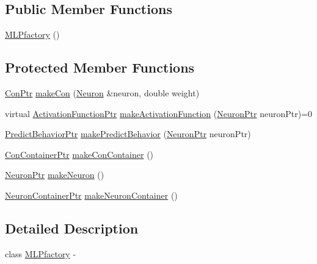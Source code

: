 \subsection*{Public Member Functions}
\begin{DoxyCompactItemize}
\item 
\hyperlink{class_m_l_pfactory_a61dfce37d0344c58e275e8508b0a474c}{MLPfactory} ()
\end{DoxyCompactItemize}
\subsection*{Protected Member Functions}
\begin{DoxyCompactItemize}
\item 
\hyperlink{_a_m_o_r_e_8h_a169bb8e5f26ce70bf2b10dec2fb5ee50}{ConPtr} \hyperlink{class_m_l_pfactory_ac47beb4aced10b9c99414ba7dd7c8b55}{makeCon} (\hyperlink{class_neuron}{Neuron} \&neuron, double weight)
\item 
virtual \hyperlink{_a_m_o_r_e_8h_a77602a0277a02e5769c3df0adc669b17}{ActivationFunctionPtr} \hyperlink{class_m_l_pfactory_a92109ea285be7dd847d359a1ade9064a}{makeActivationFunction} (\hyperlink{_a_m_o_r_e_8h_ac1ea936c2c7728eb382278131652fef4}{NeuronPtr} neuronPtr)=0
\item 
\hyperlink{_a_m_o_r_e_8h_a1fb2f1f8fdf1e08c42ef4bdce436af93}{PredictBehaviorPtr} \hyperlink{class_m_l_pfactory_a9e9e9bb4390df09c78a24c4ff79cdab6}{makePredictBehavior} (\hyperlink{_a_m_o_r_e_8h_ac1ea936c2c7728eb382278131652fef4}{NeuronPtr} neuronPtr)
\item 
\hyperlink{_a_m_o_r_e_8h_a1021dbaf961d1c8da6d58a8566e5778b}{ConContainerPtr} \hyperlink{class_m_l_pfactory_a69562b8fd06c60a2d5db66d8b0f10299}{makeConContainer} ()
\item 
\hyperlink{_a_m_o_r_e_8h_ac1ea936c2c7728eb382278131652fef4}{NeuronPtr} \hyperlink{class_m_l_pfactory_a7bb87e6e5427385b02041f2c36d1c8fb}{makeNeuron} ()
\item 
\hyperlink{_a_m_o_r_e_8h_a6157c259718f98f808c85d7f77048970}{NeuronContainerPtr} \hyperlink{class_m_l_pfactory_a174caa9d45bc964a07d86f6221e576e1}{makeNeuronContainer} ()
\end{DoxyCompactItemize}


\subsection{Detailed Description}
class \hyperlink{class_m_l_pfactory}{MLPfactory} -\/ 

